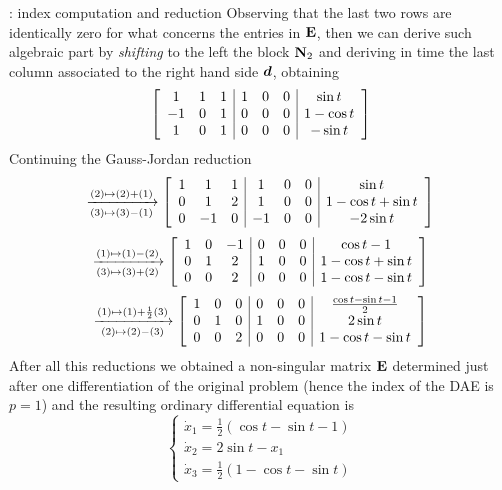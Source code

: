 \begin{example}{: index computation and reduction}
		Observing that the last two rows are identically zero for what concerns the entries in $\mathbf{E}$, then we can derive such algebraic part by \textit{shifting} to the left the block $\mathbf{N}_2$ and deriving in time the last column associated to the right hand side $\boldsymbol{d}$, obtaining
		\[ \begin{bmatrix}  \begin{array}{ ccc | ccc | c }
			1 & 1 & 1 & 1 & 0 & 0 & \sin t \\
			-1 & 0 & 1 & 0 & 0 & 0 & 1-\cos t \\
			1 & 0 & 1 & 0 & 0 & 0 & -\sin t
		\end{array}  \end{bmatrix} \]
		Continuing the Gauss-Jordan reduction
		\[ \xrightarrow[(3)\mapsto(3)-(1)]{(2)\mapsto(2)+(1)}\begin{bmatrix}  \begin{array}{ ccc | ccc | c }
				1 & 1 & 1 & 1 & 0 & 0 & \sin t \\
				0 & 1 & 2 & 1 & 0 & 0 & 1-\cos t +\sin t \\
				0 & -1 & 0 & - 1 & 0 & 0 & -2\sin t 
		\end{array}  \end{bmatrix} \]
		\[ \xrightarrow[(3)\mapsto(3)+(2)]{(1)\mapsto(1)-(2)}\begin{bmatrix}  \begin{array}{ ccc | ccc | c }
			1 & 0 & - 1 & 0 & 0 & 0 & \cos t - 1 \\
			0 & 1 & 2 & 1 & 0 & 0 & 1-\cos t +\sin t \\
			0 & 0 & 2 & 0 & 0 & 0 & 1 - \cos t - \sin t
		\end{array}  \end{bmatrix} \]
		\[ \xrightarrow[(2)\mapsto(2) - (3)]{(1)\mapsto(1)+\frac 12 (3)}\begin{bmatrix}  \begin{array}{ ccc | ccc | c }
			1 & 0 & 0 & 0 & 0 & 0 & \frac{\cos t - \sin t - 1}{2} \\
			0 & 1 & 0 & 1 & 0 & 0 & 2 \sin t \\
			0 & 0 & 2 & 0 & 0 & 0 & 1 - \cos t - \sin t
		\end{array}  \end{bmatrix} \]
		After all this reductions we obtained a non-singular matrix $\mathbf{E}$ determined just after one differentiation of the original problem (hence the index of the DAE is $p=1$) and the resulting ordinary differential equation is
		\[ \begin{cases}
			\dot x_1 = \frac 1 2 (\cos t - \sin t -1) \\ \dot x_2 = 2 \sin t - x_1 \\ \dot x_3 = \frac 1 2 (1-\cos t - \sin t)
		\end{cases} \]
	
	\end{example}
	
